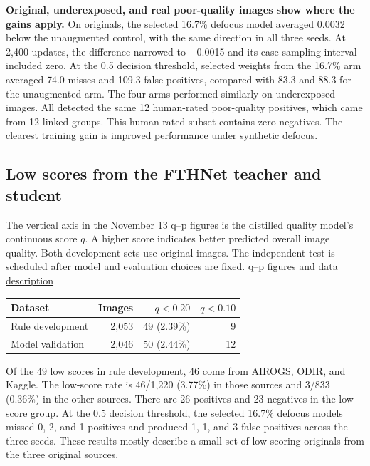 \documentclass[
  10pt,
]{article}
\newcounter{none} %
\begin{document}
\textbf{Original, underexposed, and real poor-quality images show where
the gains apply.} On originals, the selected 16.7\% defocus model
averaged 0.0032 below the unaugmented control, with the same direction
in all three seeds. At 2,400 updates, the difference narrowed to −0.0015
and its case-sampling interval included zero. At the 0.5 decision
threshold, selected weights from the 16.7\% arm averaged 74.0 misses and
109.3 false positives, compared with 83.3 and 88.3 for the unaugmented
arm. The four arms performed similarly on underexposed images. All
detected the same 12 human-rated poor-quality positives, which came from
12 linked groups. This human-rated subset contains zero negatives. The
clearest training gain is improved performance under synthetic defocus.

\newpage
\subsection{Low scores from the FTHNet teacher and
student}\label{low-scores-from-the-fthnet-teacher-and-student}

The vertical axis in the November 13 q--p figures is the distilled
quality model's continuous score \(q\). A higher score indicates better
predicted overall image quality. Both development sets use original
images. The independent test is scheduled after model and evaluation
choices are fixed. \href{../2026-11-13/progress-overview.en.md}{q--p
figures and data description}

{\def\LTcaptype{none} %
\begin{longtable}[]{@{}lrrr@{}}
\toprule\noalign{}
Dataset & Images & \(q<0.20\) & \(q<0.10\) \\
\midrule\noalign{}
\endhead
\bottomrule\noalign{}
\endlastfoot
Rule development & 2,053 & 49 (2.39\%) & 9 \\
Model validation & 2,046 & 50 (2.44\%) & 12 \\
\end{longtable}
}

Of the 49 low scores in rule development, 46 come from AIROGS, ODIR, and
Kaggle. The low-score rate is 46/1,220 (3.77\%) in those sources and
3/833 (0.36\%) in the other sources. There are 26 positives and 23
negatives in the low-score group. At the 0.5 decision threshold, the
selected 16.7\% defocus models missed 0, 2, and 1 positives and produced
1, 1, and 3 false positives across the three seeds. These results mostly
describe a small set of low-scoring originals from the three original
sources.
\end{document}
